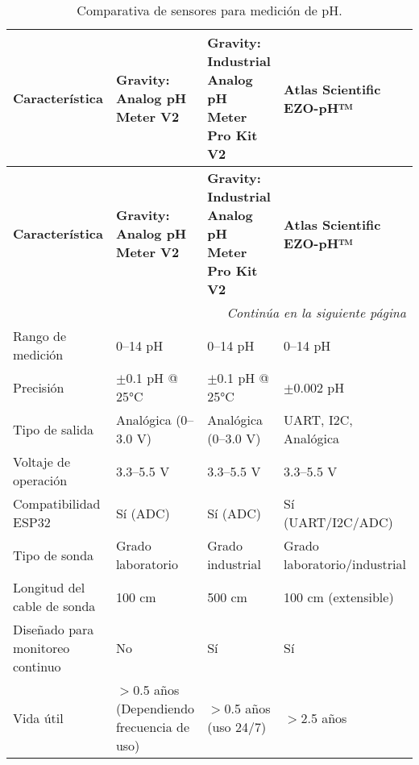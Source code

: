 \renewcommand{\arraystretch}{1.5}
\begin{longtable}{
    |p{4cm}
    |p{3cm}
    |p{3cm}
    |p{3cm}|
}
\caption{Comparativa de sensores para medición de pH.}
\label{tab:sensores_ph} \\
\hline
\textbf{Característica} 
    & \textbf{Gravity: Analog pH Meter V2 \cite{DFRobot_pH_Sensor}} 
    & \textbf{Gravity: Industrial Analog pH Meter Pro Kit V2 \cite{DFRobot_pH_Sensor}} 
    & \textbf{Atlas Scientific EZO-pH™ \cite{AtlasScientific_pH_Kit}} \\ 
\hline
\endfirsthead

\hline
\textbf{Característica} 
    & \textbf{Gravity: Analog pH Meter V2 \cite{DFRobot_pH_Sensor}} 
    & \textbf{Gravity: Industrial Analog pH Meter Pro Kit V2 \cite{DFRobot_pH_Sensor}} 
    & \textbf{Atlas Scientific EZO-pH™ \cite{AtlasScientific_pH_Kit}} \\ 
\hline
\endhead

\hline
\multicolumn{4}{r}{\textit{Continúa en la siguiente página}} \\
\endfoot

\hline
\endlastfoot

Rango de medición 
    & 0--14 pH 
    & 0--14 pH 
    & 0--14 pH \\ \hline

Precisión 
    & $\pm$0.1 pH @ 25°C 
    & $\pm$0.1 pH @ 25°C 
    & $\pm$0.002 pH \\ \hline

Tipo de salida 
    & Analógica (0--3.0 V) 
    & Analógica (0--3.0 V) 
    & UART, I2C, Analógica \\ \hline

Voltaje de operación 
    & 3.3--5.5 V 
    & 3.3--5.5 V 
    & 3.3--5.5 V \\ \hline

Compatibilidad ESP32 
    & Sí (ADC) 
    & Sí (ADC) 
    & Sí (UART/I2C/ADC) \\ \hline

Tipo de sonda 
    & Grado laboratorio 
    & Grado industrial 
    & Grado laboratorio/industrial \\ \hline

Longitud del cable de sonda 
    & 100 cm 
    & 500 cm 
    & 100 cm (extensible) \\ \hline

Diseñado para monitoreo continuo 
    & No 
    & Sí 
    & Sí \\ \hline

Vida útil 
    & $>$0.5 años (Dependiendo frecuencia de uso) 
    & $>$0.5 años (uso 24/7) 
    & $>$2.5 años \\ \hline


\end{longtable}
